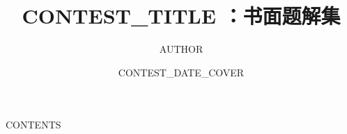 \documentclass[UTF8,fontset=none,zihao=-4]{ctexart}
\title{ {{CONTEST_TITLE}} ：书面题解集}
\author{ {{AUTHOR}} }
\date{ {{CONTEST_DATE_COVER}} }
\begin{document}
\maketitle
\tableofcontents
{{CONTENTS}}
\end{document}
